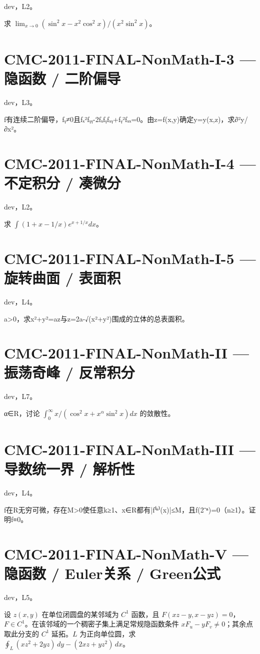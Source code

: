 \documentclass[UTF8]{ctexart}
\begin{document}
dev，L2。

求 $\lim_{x\to0}(\sin^2x-x^2\cos^2x)/(x^2\sin^2x)$。

\section*{CMC-2011-FINAL-NonMath-I-3 — 隐函数 / 二阶偏导}

dev，L3。

f有连续二阶偏导，fᵧ≠0且fₓ²fᵧᵧ-2fₓfᵧfₓᵧ+fᵧ²fₓₓ=0。由z=f(x,y)确定y=y(x,z)，求∂²y/∂x²。

\section*{CMC-2011-FINAL-NonMath-I-4 — 不定积分 / 凑微分}

dev，L2。

求 $\int(1+x-1/x)e^{x+1/x}dx$。

\section*{CMC-2011-FINAL-NonMath-I-5 — 旋转曲面 / 表面积}

dev，L4。

a>0，求x²+y²=az与z=2a-√(x²+y²)围成的立体的总表面积。

\section*{CMC-2011-FINAL-NonMath-II — 振荡奇峰 / 反常积分}

dev，L7。

α∈R，讨论 $\int_0^\infty x/(\cos^2x+x^\alpha\sin^2x)dx$ 的敛散性。

\section*{CMC-2011-FINAL-NonMath-III — 导数统一界 / 解析性}

dev，L4。

f在R无穷可微，存在M>0使任意k≥1、x∈R都有|f⁽ᵏ⁾(x)|≤M，且f(2⁻ⁿ)=0（n≥1）。证明f≡0。

\section*{CMC-2011-FINAL-NonMath-V — 隐函数 / Euler关系 / Green公式}

dev，L5。

设 $z(x,y)$ 在单位闭圆盘的某邻域为 $C^1$ 函数，且 $F(xz-y,x-yz)=0$，$F\in C^1$。在该邻域的一个稠密子集上满足常规隐函数条件 $xF_u-yF_v\ne0$；其余点取此分支的 $C^1$ 延拓。$L$ 为正向单位圆，求 $\oint_L(xz^2+2yz)\,dy-(2xz+yz^2)\,dx$。
\end{document}
